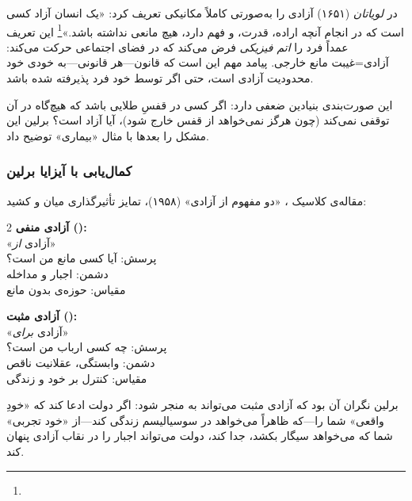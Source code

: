  در \textit{لویاتان} (۱۶۵۱) آزادی را به‌صورتی کاملاً مکانیکی تعریف کرد: «یک انسان آزاد کسی است که در انجام آنچه اراده، قدرت، و فهم دارد، هیچ مانعی نداشته باشد.»\footnote{} این تعریف عمداً فرد را \textit{اتم فیزیکی} فرض می‌کند که در فضای اجتماعی حرکت می‌کند: آزادی=غیبت مانع خارجی. پیامد مهم این است که قانون—هر قانونی—به خودی خود محدودیت آزادی است، حتی اگر توسط خود فرد پذیرفته شده باشد. %

این صورت‌بندی بنیادین ضعفی دارد: اگر کسی در قفسِ طلایی باشد که هیچ‌گاه در آن توقفی نمی‌کند (چون هرگز نمی‌خواهد از قفس خارج شود)، آیا آزاد است؟ برلین این مشکل را بعدها با مثال «بیماری» توضیح داد.

\subsubsection{کمال‌یابی با آیزایا برلین}

مقاله‌ی کلاسیک ، «دو مفهوم از آزادی» (۱۹۵۸)، تمایز تأثیرگذاری میان  و  کشید:

\begin{tcolorbox}[defbox, title={تمایز برلین}]
\begin{multicols}{2}
\textbf{\color{PrimaryDeep}آزادی منفی ():}\\ %
«آزادی \textit{از}»\\
پرسش: آیا کسی مانع من است؟\\
دشمن: اجبار و مداخله\\
مقیاس: حوزه‌ی بدون مانع\\

\columnbreak

\textbf{\color{EraContemp}آزادی مثبت ():}\\ %
«آزادی \textit{برای}»\\
پرسش: چه کسی ارباب من است؟\\
دشمن: وابستگی، عقلانیت ناقص\\
مقیاس: کنترل بر خود و زندگی\\
\end{multicols}
\end{tcolorbox}

برلین نگران آن بود که آزادی مثبت می‌تواند به  منجر شود: اگر دولت ادعا کند که «خودِ واقعی» شما را—که ظاهراً می‌خواهد در سوسیالیسم زندگی کند—از «خود تجربی» شما که می‌خواهد سیگار بکشد، جدا کند، دولت می‌تواند اجبار را در نقاب آزادی پنهان کند.

